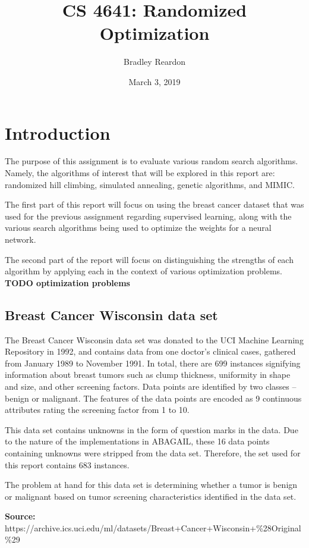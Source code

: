 \documentclass{article}
\title{\textbf{CS 4641:} Randomized Optimization}
\author{Bradley Reardon}
\date{March 3, 2019}
\begin{document}
  \maketitle

  \section{Introduction}
  The purpose of this assignment is to evaluate various random search algorithms. Namely, the algorithms of interest that will be explored in this report are: randomized hill climbing, simulated annealing, genetic algorithms, and MIMIC.

  The first part of this report will focus on using the breast cancer dataset that was used for the previous assignment regarding supervised learning, along with the various search algorithms being used to optimize the weights for a neural network.

  The second part of the report will focus on distinguishing the strengths of each algorithm by applying each in the context of various optimization problems. \textbf{TODO optimization problems} 

  \subsection{Breast Cancer Wisconsin data set}
  The Breast Cancer Wisconsin data set was donated to the UCI Machine Learning Repository in 1992, and contains data from one doctor's clinical cases, gathered from January 1989 to November 1991. In total, there are 699 instances signifying information about breast tumors such as clump thickness, uniformity in shape and size, and other screening factors. Data points are identified by two classes -- benign or malignant. The features of the data points are encoded as 9 continuous attributes rating the screening factor from 1 to 10.

  This data set contains unknowns in the form of question marks in the data. Due to the nature of the implementations in ABAGAIL, these 16 data points containing unknowns were stripped from the data set. Therefore, the set used for this report contains 683 instances.

  The problem at hand for this data set is determining whether a tumor is benign or malignant based on tumor screening characteristics identified in the data set.

  \textbf{Source:} https://archive.ics.uci.edu/ml/datasets/Breast+Cancer+Wisconsin+\%28Original\%29
\end{document}
